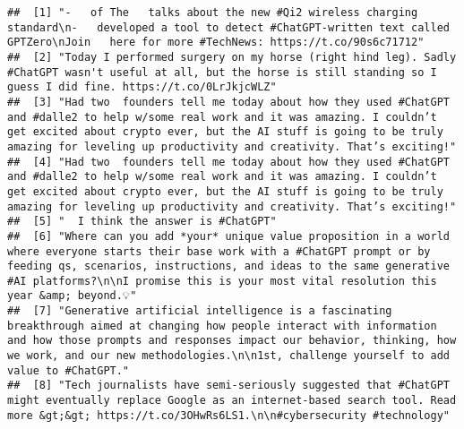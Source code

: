 \documentclass[
]{article}
\begin{document}
\begin{verbatim}
##  [1] "-   of The   talks about the new #Qi2 wireless charging standard\n-   developed a tool to detect #ChatGPT-written text called GPTZero\nJoin   here for more #TechNews: https://t.co/90s6c71712"                                                                                                                                       
##  [2] "Today I performed surgery on my horse (right hind leg). Sadly #ChatGPT wasn't useful at all, but the horse is still standing so I guess I did fine. https://t.co/0LrJkjcWLZ"                                                                                                                                                          
##  [3] "Had two  founders tell me today about how they used #ChatGPT and #dalle2 to help w/some real work and it was amazing. I couldn’t get excited about crypto ever, but the AI stuff is going to be truly amazing for leveling up productivity and creativity. That’s exciting!"                                                          
##  [4] "Had two  founders tell me today about how they used #ChatGPT and #dalle2 to help w/some real work and it was amazing. I couldn’t get excited about crypto ever, but the AI stuff is going to be truly amazing for leveling up productivity and creativity. That’s exciting!"                                                          
##  [5] "  I think the answer is #ChatGPT"                                                                                                                                                                                                                                                                                                     
##  [6] "Where can you add *your* unique value proposition in a world where everyone starts their base work with a #ChatGPT prompt or by feeding qs, scenarios, instructions, and ideas to the same generative #AI platforms?\n\nI promise this is your most vital resolution this year &amp; beyond.💡"                                       
##  [7] "Generative artificial intelligence is a fascinating breakthrough aimed at changing how people interact with information and how those prompts and responses impact our behavior, thinking, how we work, and our new methodologies.\n\n1st, challenge yourself to add value to #ChatGPT."                                              
##  [8] "Tech journalists have semi-seriously suggested that #ChatGPT might eventually replace Google as an internet-based search tool. Read more &gt;&gt; https://t.co/3OHwRs6LS1.\n\n#cybersecurity #technology"                                                                                                                             

\end{verbatim}
\end{document}

